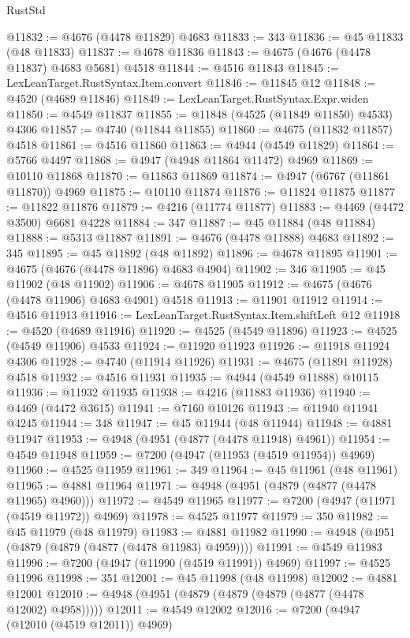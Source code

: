 \begin{lexlean}{RustStd}
\begin{coremodule}
@11832 := @4676 (@4478 @11829) @4683
@11833 := 343
@11836 := @45 @11833 (@48 @11833)
@11837 := @4678 @11836
@11843 := @4675 (@4676 (@4478 @11837) @4683 @5681) @4518
@11844 := @4516 @11843
@11845 := LexLeanTarget.RustSyntax.Item.convert
@11846 := @11845 @12
@11848 := @4520 (@4689 @11846)
@11849 := LexLeanTarget.RustSyntax.Expr.widen
@11850 := @4549 @11837
@11855 := @11848 (@4525 (@11849 @11850) @4533) @4306
@11857 := @4740 (@11844 @11855)
@11860 := @4675 (@11832 @11857) @4518
@11861 := @4516 @11860
@11863 := @4944 (@4549 @11829)
@11864 := @5766 @4497
@11868 := @4947 (@4948 @11864 @11472) @4969
@11869 := @10110 @11868
@11870 := @11863 @11869
@11874 := @4947 (@6767 (@11861 @11870)) @4969
@11875 := @10110 @11874
@11876 := @11824 @11875
@11877 := @11822 @11876
@11879 := @4216 (@11774 @11877)
@11883 := @4469 (@4472 @3500) @6681 @4228
@11884 := 347
@11887 := @45 @11884 (@48 @11884)
@11888 := @5313 @11887
@11891 := @4676 (@4478 @11888) @4683
@11892 := 345
@11895 := @45 @11892 (@48 @11892)
@11896 := @4678 @11895
@11901 := @4675 (@4676 (@4478 @11896) @4683 @4904)
@11902 := 346
@11905 := @45 @11902 (@48 @11902)
@11906 := @4678 @11905
@11912 := @4675 (@4676 (@4478 @11906) @4683 @4901) @4518
@11913 := @11901 @11912
@11914 := @4516 @11913
@11916 := LexLeanTarget.RustSyntax.Item.shiftLeft @12
@11918 := @4520 (@4689 @11916)
@11920 := @4525 (@4549 @11896)
@11923 := @4525 (@4549 @11906) @4533
@11924 := @11920 @11923
@11926 := @11918 @11924 @4306
@11928 := @4740 (@11914 @11926)
@11931 := @4675 (@11891 @11928) @4518
@11932 := @4516 @11931
@11935 := @4944 (@4549 @11888) @10115
@11936 := @11932 @11935
@11938 := @4216 (@11883 @11936)
@11940 := @4469 (@4472 @3615)
@11941 := @7160 @10126
@11943 := @11940 @11941 @4245
@11944 := 348
@11947 := @45 @11944 (@48 @11944)
@11948 := @4881 @11947
@11953 := @4948 (@4951 (@4877 (@4478 @11948) @4961))
@11954 := @4549 @11948
@11959 := @7200 (@4947 (@11953 (@4519 @11954)) @4969)
@11960 := @4525 @11959
@11961 := 349
@11964 := @45 @11961 (@48 @11961)
@11965 := @4881 @11964
@11971 := @4948 (@4951 (@4879 (@4877 (@4478 @11965) @4960)))
@11972 := @4549 @11965
@11977 := @7200 (@4947 (@11971 (@4519 @11972)) @4969)
@11978 := @4525 @11977
@11979 := 350
@11982 := @45 @11979 (@48 @11979)
@11983 := @4881 @11982
@11990 := @4948 (@4951 (@4879 (@4879 (@4877 (@4478 @11983) @4959))))
@11991 := @4549 @11983
@11996 := @7200 (@4947 (@11990 (@4519 @11991)) @4969)
@11997 := @4525 @11996
@11998 := 351
@12001 := @45 @11998 (@48 @11998)
@12002 := @4881 @12001
@12010 := @4948 (@4951 (@4879 (@4879 (@4879 (@4877 (@4478 @12002) @4958)))))
@12011 := @4549 @12002
@12016 := @7200 (@4947 (@12010 (@4519 @12011)) @4969)

\end{coremodule}
\end{lexlean}
